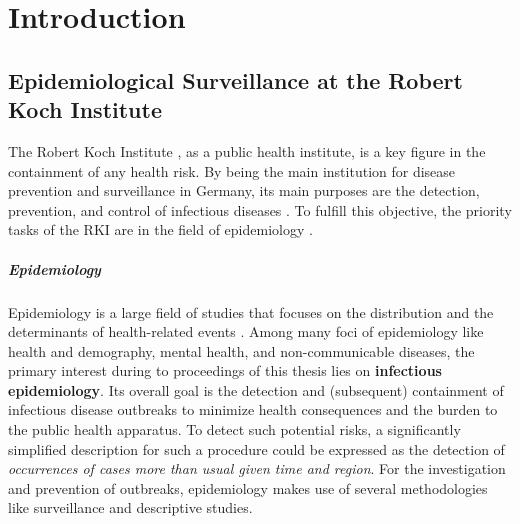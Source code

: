 \chapter{Introduction}

\section{Epidemiological Surveillance at the Robert Koch Institute}
The Robert Koch Institute , as a public health institute, is a key figure in the containment of any health risk.
By being the main institution for disease prevention and surveillance in Germany, its main purposes are the detection, prevention, and control of infectious diseases \citep{rki_definition}.
To fulfill this objective, the priority tasks of the RKI are in the field of epidemiology \citep{rki_definition}.

\paragraph{Epidemiology}
Epidemiology is a large field of studies that focuses on the distribution and the determinants of health-related events \citep{WHOepi}.
Among many foci of epidemiology like health and demography, mental health, and non-communicable diseases, the primary interest during to proceedings of this thesis lies on \textbf{infectious epidemiology}.
Its overall goal is the detection and (subsequent) containment of infectious disease outbreaks to minimize health consequences and the burden to the public health apparatus.
To detect such potential risks, a significantly simplified description for such a procedure could be expressed as the detection of \textit{occurrences of cases more than usual given time and region}.
For the investigation and prevention of outbreaks, epidemiology makes use of several methodologies like surveillance and descriptive studies.

